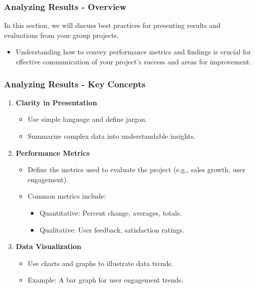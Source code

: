 \documentclass{beamer}
\begin{document}
\begin{frame}[fragile]
    \frametitle{Analyzing Results - Overview}
    In this section, we will discuss best practices for presenting results and evaluations from your group projects. 
    \begin{itemize}
        \item Understanding how to convey performance metrics and findings is crucial for effective communication of your project's success and areas for improvement.
    \end{itemize}
\end{frame}

\begin{frame}[fragile]
    \frametitle{Analyzing Results - Key Concepts}
    \begin{enumerate}
        \item \textbf{Clarity in Presentation}
        \begin{itemize}
            \item Use simple language and define jargon.
            \item Summarize complex data into understandable insights.
        \end{itemize}
        
        \item \textbf{Performance Metrics}
        \begin{itemize}
            \item Define the metrics used to evaluate the project (e.g., sales growth, user engagement).
            \item Common metrics include:
            \begin{itemize}
                \item Quantitative: Percent change, averages, totals.
                \item Qualitative: User feedback, satisfaction ratings.
            \end{itemize}
        \end{itemize}
        
        \item \textbf{Data Visualization}
        \begin{itemize}
            \item Use charts and graphs to illustrate data trends.
            \item Example: A bar graph for user engagement trends.
        \end{itemize}
    \end{enumerate}
\end{frame}
\end{document}
